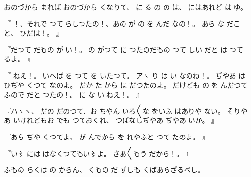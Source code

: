 おのづから
まれば
おのづから
くなりて、
に
る
の
の
は、
にはあれど
は
ゆ。

『
！、それで
つて
らしつたの！、あの
が
の
を
んだ
なの！。
あら
な
だこと、
ひだは！。
』

『だつて
だもの
が
い！。
の
がつて
に
つたのだもの
つて
しい
だと
は
つて
るよ。
』

『
ねえ！。
いへば
を
つて
を
いたつて。
アヽ
り
は
い
なのね！。
ぢやあ
は
ひぢや
くつて
なのよ。
だか
た
から
は
だつたのよ。
だけども
の
を
んだつて
ふので
だと
つたの！。
に
な
い
ねえ！。
』

『ハヽヽ、
だの
だのつて、お
ちやん
いろ〳〵な
をいふ
はありや
ない。
そりやあ
いけれどもお
でも
つておくれ、
つぱなしぢやあ
ぢやあ
いか。
』

『あら
ぢや
くつてよ、
が
んでから
を
れやふと
つて
たのよ。
』

『い〻
には
はなくつてもい〻よ。
さあ〳〵もう
だから！。
』

ふもの
らくは
の
からん、
くもの
だ
ずしも
くばあらざるべし。

